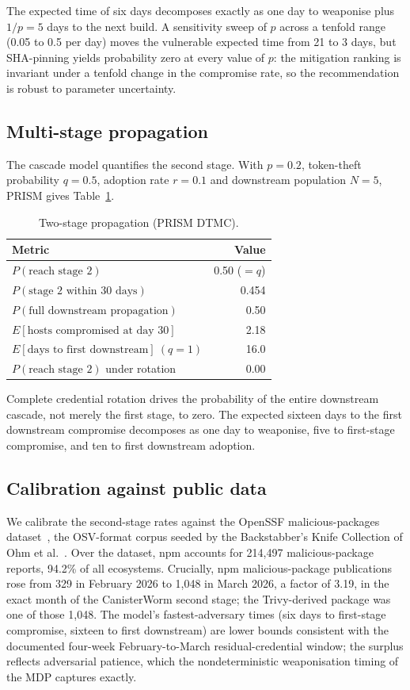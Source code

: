 \documentclass[letterpaper,twocolumn,10pt]{article}
\begin{document}
The expected time of six days decomposes exactly as one day to weaponise plus $1/p = 5$ days to the next build. A sensitivity sweep of $p$ across a tenfold range (0.05 to 0.5 per day) moves the vulnerable expected time from 21 to 3 days, but SHA-pinning yields probability zero at every value of $p$: the mitigation ranking is invariant under a tenfold change in the compromise rate, so the recommendation is robust to parameter uncertainty.

\subsection{Multi-stage propagation}
The cascade model quantifies the second stage. With $p=0.2$, token-theft probability $q=0.5$, adoption rate $r=0.1$ and downstream population $N=5$, PRISM gives Table~\ref{tab:casc}.

\begin{table}[t]\centering
\caption{Two-stage propagation (PRISM DTMC).}\label{tab:casc}
\small
\begin{tabular}{@{}lr@{}}
\toprule
Metric & Value\\
\midrule
$P(\text{reach stage 2})$ & 0.50 ($=q$)\\
$P(\text{stage 2 within 30 days})$ & 0.454\\
$P(\text{full downstream propagation})$ & 0.50\\
$E[\text{hosts compromised at day 30}]$ & 2.18\\
$E[\text{days to first downstream}]\ (q{=}1)$ & 16.0\\
$P(\text{reach stage 2})$ under rotation & 0.00\\
\bottomrule
\end{tabular}
\end{table}

Complete credential rotation drives the probability of the entire downstream cascade, not merely the first stage, to zero. The expected sixteen days to the first downstream compromise decomposes as one day to weaponise, five to first-stage compromise, and ten to first downstream adoption.

\subsection{Calibration against public data}
We calibrate the second-stage rates against the OpenSSF malicious-packages dataset~\cite{ossf}, the OSV-format corpus seeded by the Backstabber's Knife Collection of Ohm et al.~\cite{backstabber}. Over the dataset, npm accounts for 214{,}497 malicious-package reports, 94.2\% of all ecosystems. Crucially, npm malicious-package publications rose from 329 in February 2026 to 1{,}048 in March 2026, a factor of 3.19, in the exact month of the CanisterWorm second stage; the Trivy-derived package was one of those 1{,}048. The model's fastest-adversary times (six days to first-stage compromise, sixteen to first downstream) are lower bounds consistent with the documented four-week February-to-March residual-credential window; the surplus reflects adversarial patience, which the nondeterministic weaponisation timing of the MDP captures exactly.
\end{document}
